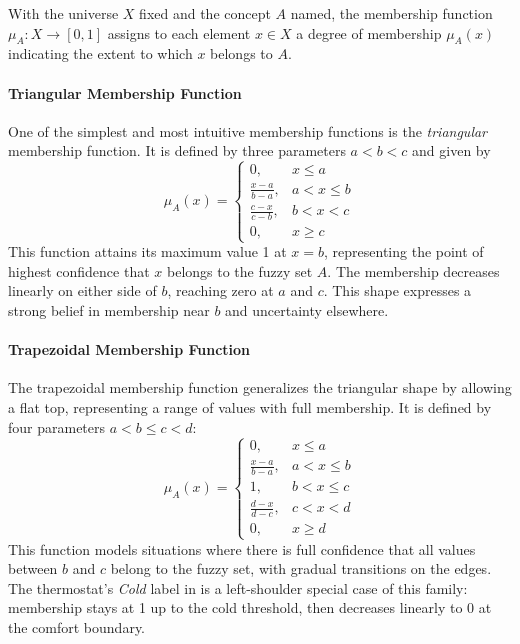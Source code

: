 With the universe \(X\) fixed and the concept \(A\) named, the membership function \(\mu_A: X \to [0,1]\) assigns to each element \(x \in X\) a degree of membership \(\mu_A(x)\) indicating the extent to which \(x\) belongs to \(A\).

\paragraph{Triangular Membership Function}

One of the simplest and most intuitive membership functions is the \emph{triangular} membership function. It is defined by three parameters \(a < b < c\) and given by
\begin{equation}
\mu_A(x) = \begin{cases}
0, & x \leq a \\
\frac{x - a}{b - a}, & a < x \leq b \\
\frac{c - x}{c - b}, & b < x < c \\
0, & x \geq c
\end{cases}
\label{eq:triangular-mf}
\end{equation}
This function attains its maximum value 1 at \(x = b\), representing the point of highest confidence that \(x\) belongs to the fuzzy set \(A\). The membership decreases linearly on either side of \(b\), reaching zero at \(a\) and \(c\). This shape expresses a strong belief in membership near \(b\) and uncertainty elsewhere.

\paragraph{Trapezoidal Membership Function}

The trapezoidal membership function generalizes the triangular shape by allowing a flat top, representing a range of values with full membership. It is defined by four parameters \(a < b \leq c < d\):
\begin{equation}
\mu_A(x) = \begin{cases}
0, & x \leq a \\
\frac{x - a}{b - a}, & a < x \leq b \\
1, & b < x \leq c \\
\frac{d - x}{d - c}, & c < x < d \\
0, & x \geq d
\end{cases}
\label{eq:trapezoidal-mf}
\end{equation}
This function models situations where there is full confidence that all values between \(b\) and \(c\) belong to the fuzzy set, with gradual transitions on the edges.
The thermostat's \textit{Cold} label in  is a left-shoulder special case of this family: membership stays at 1 up to the cold threshold, then decreases linearly to 0 at the comfort boundary.

